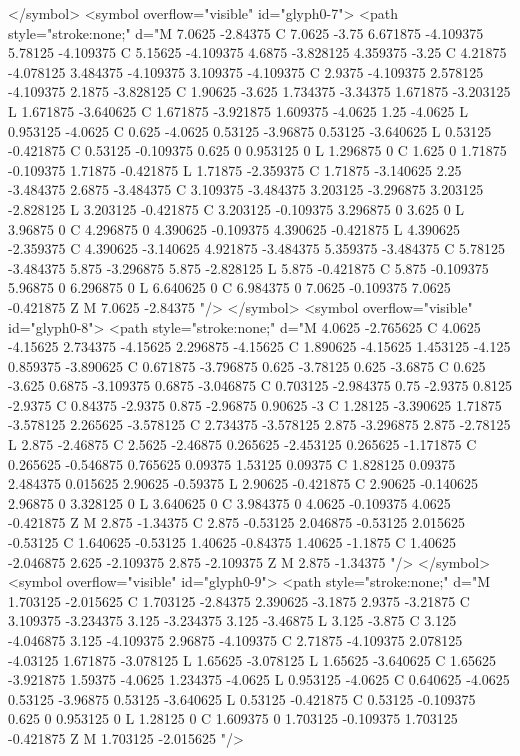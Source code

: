 </symbol>
<symbol overflow="visible" id="glyph0-7">
<path style="stroke:none;" d="M 7.0625 -2.84375 C 7.0625 -3.75 6.671875 -4.109375 5.78125 -4.109375 C 5.15625 -4.109375 4.6875 -3.828125 4.359375 -3.25 C 4.21875 -4.078125 3.484375 -4.109375 3.109375 -4.109375 C 2.9375 -4.109375 2.578125 -4.109375 2.1875 -3.828125 C 1.90625 -3.625 1.734375 -3.34375 1.671875 -3.203125 L 1.671875 -3.640625 C 1.671875 -3.921875 1.609375 -4.0625 1.25 -4.0625 L 0.953125 -4.0625 C 0.625 -4.0625 0.53125 -3.96875 0.53125 -3.640625 L 0.53125 -0.421875 C 0.53125 -0.109375 0.625 0 0.953125 0 L 1.296875 0 C 1.625 0 1.71875 -0.109375 1.71875 -0.421875 L 1.71875 -2.359375 C 1.71875 -3.140625 2.25 -3.484375 2.6875 -3.484375 C 3.109375 -3.484375 3.203125 -3.296875 3.203125 -2.828125 L 3.203125 -0.421875 C 3.203125 -0.109375 3.296875 0 3.625 0 L 3.96875 0 C 4.296875 0 4.390625 -0.109375 4.390625 -0.421875 L 4.390625 -2.359375 C 4.390625 -3.140625 4.921875 -3.484375 5.359375 -3.484375 C 5.78125 -3.484375 5.875 -3.296875 5.875 -2.828125 L 5.875 -0.421875 C 5.875 -0.109375 5.96875 0 6.296875 0 L 6.640625 0 C 6.984375 0 7.0625 -0.109375 7.0625 -0.421875 Z M 7.0625 -2.84375 "/>
</symbol>
<symbol overflow="visible" id="glyph0-8">
<path style="stroke:none;" d="M 4.0625 -2.765625 C 4.0625 -4.15625 2.734375 -4.15625 2.296875 -4.15625 C 1.890625 -4.15625 1.453125 -4.125 0.859375 -3.890625 C 0.671875 -3.796875 0.625 -3.78125 0.625 -3.6875 C 0.625 -3.625 0.6875 -3.109375 0.6875 -3.046875 C 0.703125 -2.984375 0.75 -2.9375 0.8125 -2.9375 C 0.84375 -2.9375 0.875 -2.96875 0.90625 -3 C 1.28125 -3.390625 1.71875 -3.578125 2.265625 -3.578125 C 2.734375 -3.578125 2.875 -3.296875 2.875 -2.78125 L 2.875 -2.46875 C 2.5625 -2.46875 0.265625 -2.453125 0.265625 -1.171875 C 0.265625 -0.546875 0.765625 0.09375 1.53125 0.09375 C 1.828125 0.09375 2.484375 0.015625 2.90625 -0.59375 L 2.90625 -0.421875 C 2.90625 -0.140625 2.96875 0 3.328125 0 L 3.640625 0 C 3.984375 0 4.0625 -0.109375 4.0625 -0.421875 Z M 2.875 -1.34375 C 2.875 -0.53125 2.046875 -0.53125 2.015625 -0.53125 C 1.640625 -0.53125 1.40625 -0.84375 1.40625 -1.1875 C 1.40625 -2.046875 2.625 -2.109375 2.875 -2.109375 Z M 2.875 -1.34375 "/>
</symbol>
<symbol overflow="visible" id="glyph0-9">
<path style="stroke:none;" d="M 1.703125 -2.015625 C 1.703125 -2.84375 2.390625 -3.1875 2.9375 -3.21875 C 3.109375 -3.234375 3.125 -3.234375 3.125 -3.46875 L 3.125 -3.875 C 3.125 -4.046875 3.125 -4.109375 2.96875 -4.109375 C 2.71875 -4.109375 2.078125 -4.03125 1.671875 -3.078125 L 1.65625 -3.078125 L 1.65625 -3.640625 C 1.65625 -3.921875 1.59375 -4.0625 1.234375 -4.0625 L 0.953125 -4.0625 C 0.640625 -4.0625 0.53125 -3.96875 0.53125 -3.640625 L 0.53125 -0.421875 C 0.53125 -0.109375 0.625 0 0.953125 0 L 1.28125 0 C 1.609375 0 1.703125 -0.109375 1.703125 -0.421875 Z M 1.703125 -2.015625 "/>
